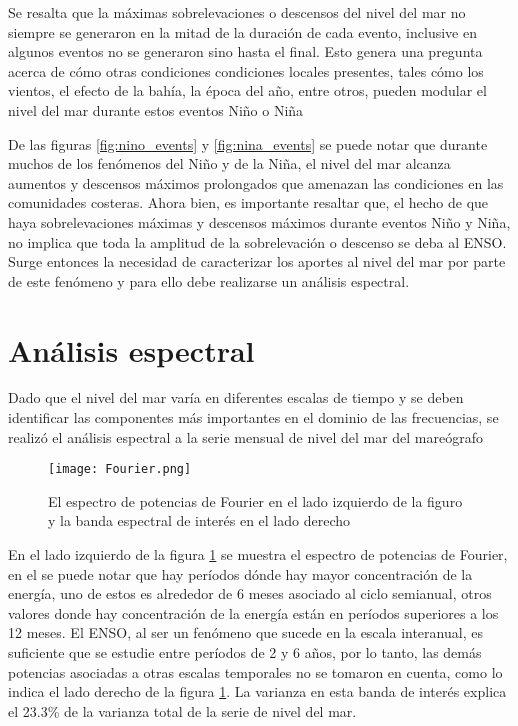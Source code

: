 Se resalta que la máximas sobrelevaciones o descensos del nivel del mar no siempre se generaron en la mitad de la duración de cada evento, inclusive en algunos eventos no se generaron sino hasta el final. Esto genera una pregunta acerca de cómo otras condiciones condiciones locales presentes, tales cómo los vientos, el efecto de la bahía, la época del año, entre otros, pueden modular el nivel del mar durante estos eventos Niño o Niña

De las figuras \ref{fig:nino_events} y \ref{fig:nina_events} se puede notar que durante muchos de los fenómenos del Niño y de la Niña, el nivel del mar alcanza aumentos y descensos máximos prolongados que amenazan las condiciones en las comunidades costeras. Ahora bien, es importante resaltar que, el hecho de que haya sobrelevaciones máximas y descensos máximos durante eventos Niño y Niña, no implica que toda la amplitud de la sobrelevación o descenso se deba al ENSO. Surge entonces la necesidad de caracterizar los aportes al nivel del mar por parte de este fenómeno y para ello debe realizarse un análisis espectral.
%
\section{Análisis espectral}

Dado que el nivel del mar varía en diferentes escalas de tiempo y se deben identificar las componentes más importantes en el dominio de las frecuencias, se realizó el análisis espectral a la serie mensual de nivel del mar del mareógrafo

\begin{figure}[h]
	\centering
	\texttt{[image: Fourier.png]}
	\caption{El espectro de potencias de Fourier en el lado izquierdo de la figuro y la banda espectral de interés en el lado derecho}
	\label{fig:fourier}
\end{figure}

En el lado izquierdo de la figura \ref{fig:fourier} se muestra el espectro de potencias de Fourier, en el se puede notar que hay períodos dónde hay mayor concentración de la energía, uno de estos es alrededor de 6 meses asociado al ciclo semianual, otros valores donde hay concentración de la energía están en períodos superiores a los 12 meses. El ENSO, al ser un fenómeno que sucede en la escala interanual, es suficiente que se estudie entre períodos de 2 y 6 años, por lo tanto, las demás potencias asociadas a otras escalas temporales no se tomaron en cuenta, como lo indica el lado derecho de la figura \ref{fig:fourier}. La varianza en esta banda de interés explica el 23.3\% de la varianza total de la serie de nivel del mar.

